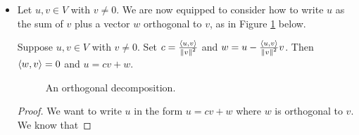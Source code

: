 \documentclass[../main.tex]{subfiles}
\begin{document}
\begin{itemize}
\begin{theorem}
\begin{proof}
\begin{align*}
                &= \norm{u}^2+0+0+\norm{v}^2\\
                &= \norm{u}^2+\norm{v}^2
            \end{align*}
            as desired.
        \end{proof}
    \end{theorem}
    \begin{itemize}
        \item Note that we can prove the converse of the Pythagorean Theorem in \emph{real} inner product spaces as follows: If $\norm{u+v}^2=\norm{u}^2+\norm{v}^2$ for $u,v$ real, then
        \begin{align*}
            0 &= \inp{u}{v}+\inp{v}{u}\\
            &= \inp{u}{v}+\overline{\inp{u}{v}}\\
            &= 2\Re\inp{u}{v}\\
            &= \inp{u}{v}
        \end{align*}
        as desired.
    \end{itemize}
    \item Let $u,v\in V$ with $v\neq 0$. We are now equipped to consider how to write $u$ as the sum of $v$ plus a vector $w$ orthogonal to $v$, as in Figure \ref{fig:orthogonalDecomposition} below.
    \begin{theorem}\label{trm:orthogonalDecomposition}
        Suppose $u,v\in V$ with $v\neq 0$. Set $c=\frac{\langle{u},{v}\rangle}{\norm{v}^2}$ and $w=u-\frac{\langle{u},{v}\rangle}{\norm{v}^2}v$. Then $\langle{w},{v}\rangle=0$ and $u=cv+w$.
        \begin{figure}[h!]
            \centering
            \caption{An orthogonal decomposition.}
            \label{fig:orthogonalDecomposition}
        \end{figure}
        \begin{proof}
            We want to write $u$ in the form $u=cv+w$ where $w$ is orthogonal to $v$. We know that

\end{proof}
\end{theorem}
\end{itemize}
\end{document}
